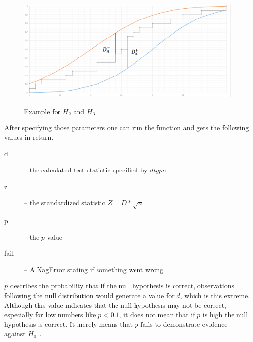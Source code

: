 \documentclass{article}
\theoremstyle{definition}
\begin{document}
\begin{figure}[here]
\caption{Example for $H_2$ and $H_3$}
\center
\includegraphics[width=.99\textwidth]{figures/diagramKSd-d+.png}
\label{fig:2}
\end{figure}

After specifying those parameters one can run the function and gets the following values in return.
\begin{description}
\item[d] -- the calculated test statistic specified by $dtype$
\item[z] -- the standardized  statistic $Z=D*\sqrt n$
\item[p] -- the $p$-value
\item[fail] -- A NagError stating if something went wrong
\end{description}
$p$ describes the probability that if the null hypothesis is correct, observations following the null distribution would generate a value for $d$, which is this extreme.
Although this value indicates that the null hypothesis may not be correct, especially for low numbers like $p<0.1$, it does not mean that if $p$ is high the null hypothesis is correct. It merely means that $p$ fails to demonstrate evidence against $H_0$~\cite{conover1980practical}.
\end{document}
